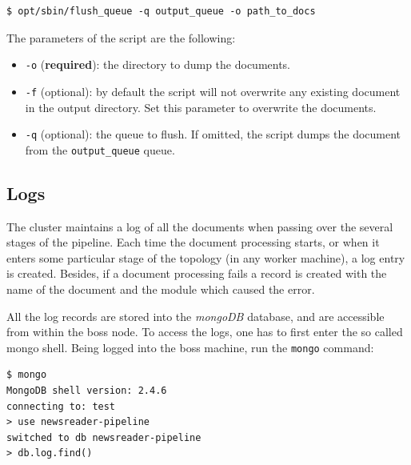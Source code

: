\documentclass[a4]{article}
\begin{document}
\begin{verbatim}
$ opt/sbin/flush_queue -q output_queue -o path_to_docs
\end{verbatim}

The parameters of the script are the following:
\begin{itemize}
\item \texttt{-o} (\textbf{required}): the directory to dump the documents.
\item \texttt{-f} (optional): by default the script will not overwrite any
  existing document in the output directory. Set this parameter to overwrite
  the documents.
\item \texttt{-q} (optional): the queue to flush. If omitted, the script
  dumps the document from the \texttt{output\_queue} queue.
\end{itemize}

\subsection*{Logs}
\label{sec:logs}

The cluster maintains a log of all the documents when passing over the
several stages of the pipeline. Each time the document processing starts, or
when it enters some particular stage of the topology (in any worker
machine), a log entry is created. Besides, if a document processing fails a
record is created with the name of the document and the module which caused
the error.

All the log records are stored into the \emph{mongoDB} database, and are
accessible from within the boss node. To access the logs, one has to first
enter the so called mongo shell. Being logged into the boss machine, run the
\texttt{mongo} command:

\begin{verbatim}
$ mongo
MongoDB shell version: 2.4.6
connecting to: test
> use newsreader-pipeline
switched to db newsreader-pipeline
> db.log.find()
\end{verbatim}
\end{document}

